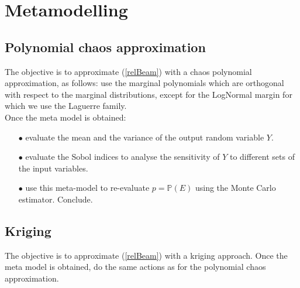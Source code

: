 \documentclass[11pt, french, A4wide]{article}
\theoremstyle{remark}
\theoremstyle{definition}
\begin{document}
\section{Metamodelling}

\subsection{Polynomial chaos approximation}

The objective is to approximate (\ref{relBeam}) with a chaos polynomial approximation, as follows: use the marginal polynomials which are orthogonal with respect to the marginal distributions, except for the LogNormal margin for which we use the Laguerre family.\\

Once the meta model is obtained:
\begin{itemize}
 \item[$\bullet$] evaluate the mean and the variance of the output random variable $Y$.
 \item[$\bullet$] evaluate the Sobol indices to analyse the sensitivity of $Y$ to different sets of the input variables.
 \item[$\bullet$] use this meta-model to re-evaluate $p=\mathbb{P}(E)$ using the Monte Carlo estimator. Conclude.
 \end{itemize}



\subsection{Kriging}

The objective is to approximate (\ref{relBeam}) with a kriging approach. Once the meta model is obtained, do the same actions as for the polynomial chaos approximation.
\end{document}
